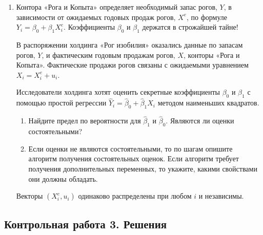 \begin{enumerate}
\item Контора «Рога и Копыта» определяет
	необходимый запас рогов, $Y$, в зависимости от ожидаемых годовых продаж рогов,
	$X^e$, по формуле $Y_i = \beta_0 + \beta_1 X^e_i$. Коэффициенты $\beta_0$ и $\beta_1$ держатся в строжайшей тайне!

	В распоряжении холдинга «Рог изобилия» оказались данные
	по запасам рогов, $Y$, и фактическим годовым продажам рогов, $X$, конторы «Рога и Копыта». Фактические продажи рогов связаны с ожидаемыми уравнением $X_i = X_i^e + u_i$.

Исследователи холдинга хотят оценить секретные коэффициенты $\beta_0$ и $\beta_1$ с помощью простой регрессии $\hat Y_i = \hat \beta_0 + \hat \beta_1 X_i$ методом наименьших квадратов.

\begin{enumerate}

	\item Найдите предел по вероятности для $\hat \beta_1$ и $\hat\beta_0$. Являются ли оценки состоятельными?
	\item Если оценки не являются состоятельными, то по шагам опишите алгоритм получения состоятельных оценок. Если алгоритм требует получения дополнительных переменных, то укажите, какими свойствами они должны обладать.

\end{enumerate}


Векторы $(X_i^e, u_i)$ одинаково распределены при любом $i$ и независимы.



\end{enumerate}

\subsection{Контрольная работа 3. Решения}

